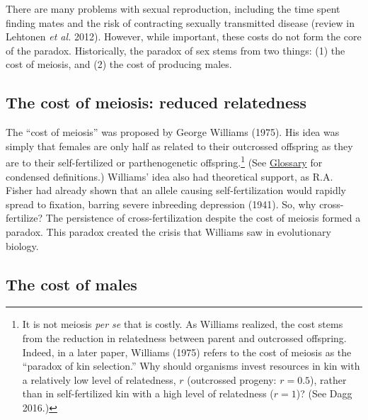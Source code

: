 \documentclass[
  letterpaper,
]{book}
\begin{document}
There are many problems with sexual reproduction, including the time
spent finding mates and the risk of contracting sexually transmitted
disease (review in Lehtonen \emph{et al.} 2012). However, while
important, these costs do not form the core of the paradox.
Historically, the paradox of sex stems from two things: (1) the cost of
meiosis, and (2) the cost of producing males.

\subsection{The cost of meiosis: reduced
relatedness}\label{the-cost-of-meiosis-reduced-relatedness}

The ``cost of meiosis'' was proposed by George Williams (1975). His idea
was simply that females are only half as related to their outcrossed
offspring as they are to their self-fertilized or parthenogenetic
offspring.\footnote{It is not meiosis \emph{per se} that is costly. As
  Williams realized, the cost stems from the reduction in relatedness
  between parent and outcrossed offspring. Indeed, in a later paper,
  Williams (1975) refers to the cost of meiosis as the ``paradox of kin
  selection.'' Why should organisms invest resources in kin with a
  relatively low level of relatedness, \(r\) (outcrossed progeny:
  \(r = 0.5\)), rather than in self-fertilized kin with a high level of
  relatedness (\(r = 1\))? (See Dagg 2016.)} (See
\hyperref[sec-glossary]{Glossary} for condensed definitions.) Williams'
idea also had theoretical support, as R.A. Fisher had already shown that
an allele causing self-fertilization would rapidly spread to fixation,
barring severe inbreeding depression (1941). So, why cross-fertilize?
The persistence of cross-fertilization despite the cost of meiosis
formed a paradox. This paradox created the crisis that Williams saw in
evolutionary biology.

\subsection{The cost of males}\label{the-cost-of-males}
\end{document}
